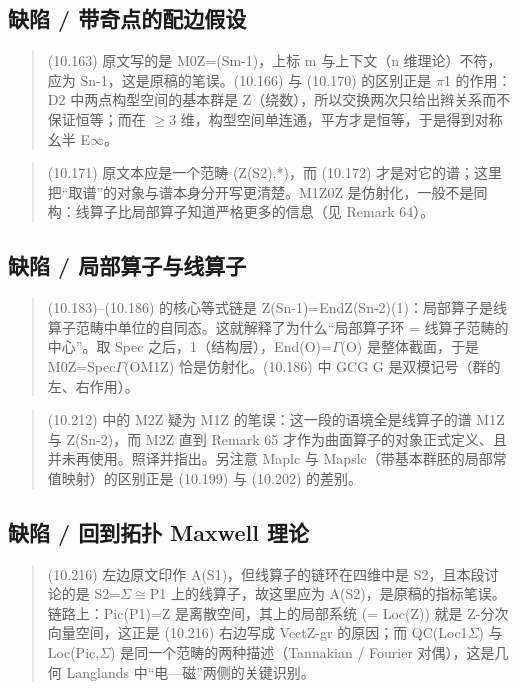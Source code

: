 \subsection*{缺陷 / 带奇点的配边假设}
\begin{quote}\small
(10.163) 原文写的是 M0Z=(Sm-1)，上标 m 与上下文（n 维理论）不符，应为 Sn-1，这是原稿的笔误。(10.166) 与 (10.170) 的区别正是 $\pi$1 的作用：D2 中两点构型空间的基本群是 Z（绕数），所以交换两次只给出辫关系而不保证恒等；而在 $\ge$3 维，构型空间单连通，平方才是恒等，于是得到对称幺半 E$\infty$。
\end{quote}

\begin{quote}\small
(10.171) 原文本应是一个范畴 (Z(S2),*)，而 (10.172) 才是对它的谱；这里把“取谱”的对象与谱本身分开写更清楚。M1Z0Z 是仿射化，一般不是同构：线算子比局部算子知道严格更多的信息（见 Remark 64）。
\end{quote}

\subsection*{缺陷 / 局部算子与线算子}
\begin{quote}\small
(10.183)--(10.186) 的核心等式链是 Z(Sn-1)=EndZ(Sn-2)(1)：局部算子是线算子范畴中单位的自同态。这就解释了为什么“局部算子环 = 线算子范畴的中心”。取 Spec 之后，1（结构层），End(O)=$\Gamma$(O) 是整体截面，于是 M0Z=Spec$\Gamma$(OM1Z) 恰是仿射化。(10.186) 中 GCG G 是双模记号（群的左、右作用）。
\end{quote}

\begin{quote}\small
(10.212) 中的 M2Z 疑为 M1Z 的笔误：这一段的语境全是线算子的谱 M1Z 与 Z(Sn-2)，而 M2Z 直到 Remark 65 才作为曲面算子的对象正式定义、且并未再使用。照译并指出。另注意 Maplc 与 Mapslc（带基本群胚的局部常值映射）的区别正是 (10.199) 与 (10.202) 的差别。
\end{quote}

\subsection*{缺陷 / 回到拓扑 Maxwell 理论}
\begin{quote}\small
(10.216) 左边原文印作 A(S1)，但线算子的链环在四维中是 S2，且本段讨论的是 S2=$\Sigma$$\cong$P1 上的线算子，故这里应为 A(S2)，是原稿的指标笔误。链路上：Pic(P1)=Z 是离散空间，其上的局部系统 (= Loc(Z)) 就是 Z-分次向量空间，这正是 (10.216) 右边写成 VectZ-gr 的原因；而 QC(Loc1$\Sigma$) 与 Loc(Pic,$\Sigma$) 是同一个范畴的两种描述（Tannakian / Fourier 对偶），这是几何 Langlands 中“电—磁”两侧的关键识别。
\end{quote}

